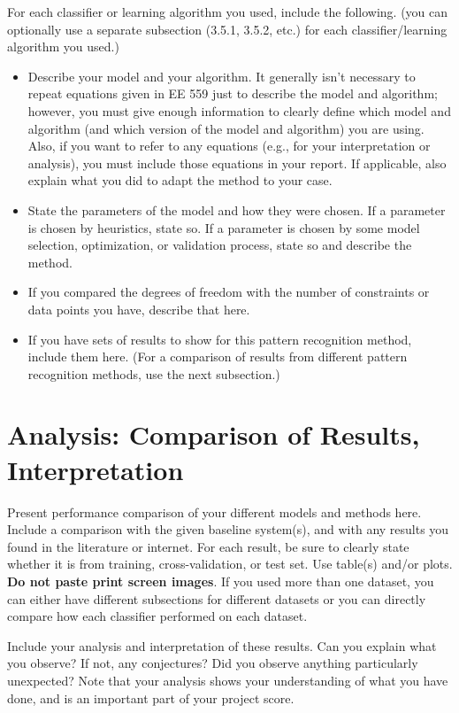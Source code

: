 \documentclass[singlecolumn]{article}
\begin{document}
For each classifier or learning algorithm you used, include the following. (you can optionally use a separate subsection (3.5.1, 3.5.2, etc.) for each classifier/learning algorithm you used.) 
\begin{itemize}
	\item Describe your model and your algorithm. It generally isn't necessary to repeat equations given in EE 559 just to describe the model and algorithm; however, you must give enough information to clearly define which model and algorithm (and which version of the model and algorithm) you are using. Also, if you want to refer to any equations (e.g., for your interpretation or analysis), you must include those equations in your report. If applicable, also explain what you did to adapt the method to your case. 
	\item State the parameters of the model and how they were chosen. If a parameter is chosen by heuristics, state so. If a parameter is chosen by some model selection, optimization, or validation process, state so and describe the method. 
	\item If you compared the degrees of freedom with the number of constraints or data points you have, describe that here. 
	\item If you have sets of results to show for this pattern recognition method, include them here. (For a comparison of results from different pattern recognition methods, use the next subsection.) 
\end{itemize}

\section{Analysis: Comparison of Results, Interpretation}
Present performance comparison of your different models and methods here. Include a comparison with the given baseline system(s), and with any results you found in the literature or internet. For each result, be sure to clearly state whether it is from training, cross-validation, or test set. Use table(s) and/or plots. \textbf{Do not paste print screen images}. If you used more than one dataset, you can either have different subsections for different datasets or you can directly compare how each classifier performed on each dataset.

Include your analysis and interpretation of these results. Can you explain what you observe? If not, any conjectures? Did you observe anything particularly unexpected?  Note that your analysis shows your understanding of what you have done, and is an important part of your project score. 
\end{document}
